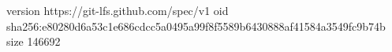 version https://git-lfs.github.com/spec/v1
oid sha256:e80280d6a53c1e686cdcc5a0495a99f8f5589b6430888af41584a3549fc9b74b
size 146692
